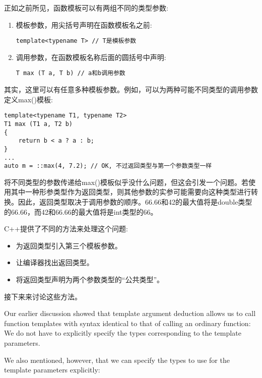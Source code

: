 
正如之前所见，函数模板可以有两组不同的类型参数:

\begin{enumerate}
\item 
模板参数，用尖括号声明在函数模板名之前:
\begin{lstlisting}[style=styleCXX]
template<typename T> // T是模板参数
\end{lstlisting}

\item 
调用参数，在函数模板名称后面的圆括号中声明:
\begin{lstlisting}[style=styleCXX]
T max (T a, T b) // a和b调用参数
\end{lstlisting}
\end{enumerate}

其实，这里可以有任意多种模板参数。例如，可以为两种可能不同类型的调用参数定义max()模板:

\begin{lstlisting}[style=styleCXX]
template<typename T1, typename T2>
T1 max (T1 a, T2 b)
{
	return b < a ? a : b;
}
...
auto m = ::max(4, 7.2); // OK, 不过返回类型与第一个参数类型一样
\end{lstlisting}

将不同类型的参数传递给max()模板似乎没什么问题，但这会引发一个问题。若使用其中一种形参类型作为返回类型，则其他参数的实参可能需要向这种类型进行转换。因此，返回类型取决于调用参数的顺序。66.66和42的最大值将是double类型的66.66，而42和66.66的最大值将是int类型的66。

C++提供了不同的方法来处理这个问题:

\begin{itemize}
\item
为返回类型引入第三个模板参数。

\item
让编译器找出返回类型。

\item
将返回类型声明为两个参数类型的“公共类型”。
\end{itemize}

接下来来讨论这些方法。


Our earlier discussion showed that template argument deduction allows us to call function templates with syntax identical to that of calling an ordinary function: We do not have to explicitly specify the types corresponding to the template parameters.

We also mentioned, however, that we can specify the types to use for the template parameters explicitly:

